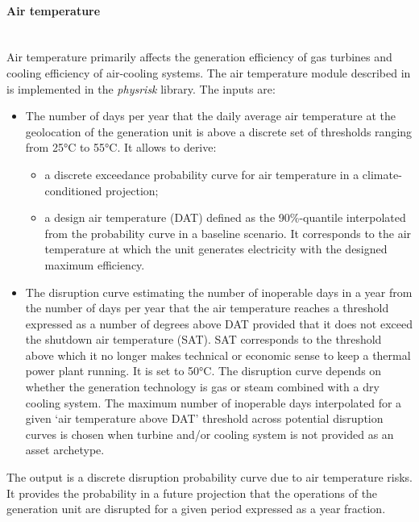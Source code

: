 \documentclass[a4paper,11pt]{extarticle} %
\theoremstyle{definition}
\begin{document}
\paragraph{Air temperature\\}
\textbf{\\}
Air temperature primarily affects the generation efficiency of gas turbines and cooling efficiency of air-cooling systems. The air temperature module described in \cite{LuoEtAl:2021,LuoEtAl:2023} is implemented in the \emph{physrisk} library. The inputs are:
\begin{itemize}
\item The number of days per year that the daily average air temperature at the geolocation of the generation unit is above a discrete set of thresholds ranging from 25°C to 55°C. It allows to derive:
\begin{itemize}
\item a discrete exceedance probability curve for air temperature in a climate-conditioned projection;
\item a design air temperature (DAT) defined as the 90\%-quantile interpolated from the probability curve in a baseline scenario. It corresponds to the air temperature at which the unit generates electricity with the designed maximum efficiency.
\end{itemize}
\item The disruption curve estimating the number of inoperable days in a year from the number of days per year that the air temperature reaches a threshold expressed as a number of degrees above DAT provided that it does not exceed the shutdown air temperature (SAT). SAT corresponds to the threshold above which it no longer makes technical or economic sense to keep a thermal power plant running. It is set to 50°C. The disruption curve depends on whether the generation technology is gas or steam combined with a dry cooling system. The maximum number of inoperable days interpolated for a given `air temperature above DAT' threshold across potential disruption curves is chosen when turbine and/or cooling system is not provided as an asset archetype.
\end{itemize}
The output is a discrete disruption probability curve due to air temperature risks. It provides the probability in a future projection that the operations of the generation unit are disrupted for a given period expressed as a year fraction.
\end{document}
